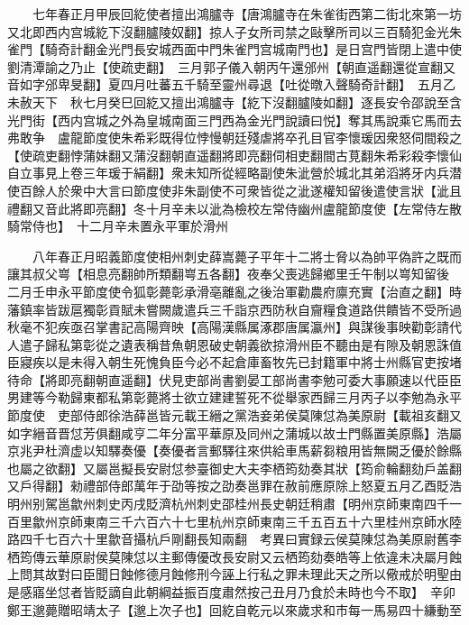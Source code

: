 　　七年春正月甲辰回紇使者擅出鴻臚寺【唐鴻臚寺在朱雀街西第二街北來第一坊又北即西内宫城紇下沒翻臚陵奴翻】掠人子女所司禁之敺擊所司以三百騎犯金光朱雀門【騎奇計翻金光門長安城西面中門朱雀門宫城南門也】是日宫門皆閉上遣中使劉清潭諭之乃止【使疏吏翻】　三月郭子儀入朝丙午還邠州【朝直遥翻還從宣翻又音如字邠卑旻翻】夏四月吐蕃五千騎至靈州尋退【吐從暾入聲騎奇計翻】　五月乙未赦天下　秋七月癸巳回紇又擅出鴻臚寺【紇下沒翻臚陵如翻】逐長安令邵說至含光門街【西内宫城之外為皇城南面三門西為金光門說讀曰悦】奪其馬說乘它馬而去弗敢争　盧龍節度使朱希彩既得位悖慢朝廷殘虐將卒孔目官李懷瑗因衆怒伺間殺之【使疏吏翻悖蒲妹翻又蒲沒翻朝直遥翻將即亮翻伺相吏翻間古莧翻朱希彩殺李懷仙自立事見上卷三年瑗于絹翻】衆未知所從經略副使朱泚營於城北其弟滔將牙内兵潜使百餘人於衆中大言曰節度使非朱副使不可衆皆從之泚遂權知留後遣使言狀【泚且禮翻又音此將即亮翻】冬十月辛未以泚為檢校左常侍幽州盧龍節度使【左常侍左散騎常侍也】　十二月辛未置永平軍於滑州

　　八年春正月昭義節度使相州刺史薛嵩薨子平年十二將士脅以為帥平偽許之既而讓其叔父㟧【相息亮翻帥所類翻㟧五各翻】夜奉父喪逃歸鄉里壬午制以㟧知留後　二月壬申永平節度使令狐彰薨彰承滑亳離亂之後治軍勸農府廪充實【治直之翻】時藩鎮率皆跋扈獨彰貢賦未嘗闕歲遣兵三千詣京西防秋自齎糧食道路供饋皆不受所過秋毫不犯疾亟召掌書記高陽齊映【高陽漢縣属涿郡唐属瀛州】與謀後事映勸彰請代人遣子歸私第彰從之遺表稱昔魚朝恩破史朝義欲掠滑州臣不聽由是有隙及朝恩誅值臣寢疾以是未得入朝生死愧負臣今必不起倉庫畜牧先已封籍軍中將士州縣官吏按堵待命【將即亮翻朝直遥翻】伏見吏部尚書劉晏工部尚書李勉可委大事願速以代臣臣男建等今勒歸東都私第彰薨將士欲立建建誓死不從舉家西歸三月丙子以李勉為永平節度使　吏部侍郎徐浩薛邕皆元載王縉之黨浩妾弟侯莫陳怤為美原尉【載祖亥翻又如字縉音晋怤芳俱翻咸亨二年分富平華原及同州之蒲城以故士門縣置美原縣】浩屬京兆尹杜濟虚以知驛奏優【奏優者言郵驛往來供給車馬薪芻粮用皆無闕乏優於餘縣也屬之欲翻】又屬邕擬長安尉怤参臺御史大夫李栖筠劾奏其狀【筠俞輪翻劾戶盖翻又戶得翻】勑禮部侍郎萬年于劭等按之劭奏邕罪在赦前應原除上怒夏五月乙酉貶浩明州别駕邕歙州刺史丙戌貶濟杭州刺史邵桂州長史朝廷稍肅【明州京師東南四千一百里歙州京師東南三千六百六十七里杭州京師東南三千五百五十六里桂州京師水陸路四千七百六十里歙音攝杭戶剛翻長知兩翻　考異曰實録云侯莫陳怤為美原尉舊李栖筠傳云華原尉侯莫陳怤以主郵傳優改長安尉又云栖筠劾奏皓等上依違未决屬月蝕上問其故對曰臣聞日蝕修德月蝕修刑今誣上行私之罪未理此天之所以儆戒於明聖由是感寤坐怤者皆貶謫自此朝綱益振百度肅然按己丑月乃食於未時也今不取】　辛卯鄭王邈薨贈昭靖太子【邈上次子也】回紇自乾元以來歲求和市每一馬易四十縑動至

